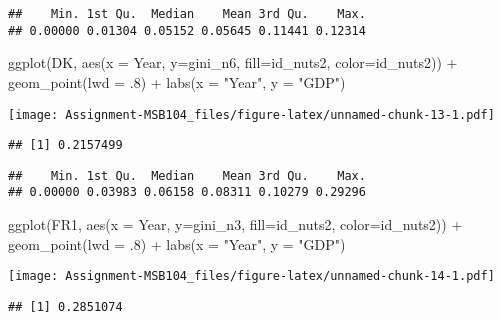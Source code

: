 \documentclass[
]{article}
\newenvironment{Shaded}{\begin{snugshade}}{\end{snugshade}}
\newcommand{\AttributeTok}[1]{\textcolor[rgb]{0.77,0.63,0.00}{#1}}
\newcommand{\DecValTok}[1]{\textcolor[rgb]{0.00,0.00,0.81}{#1}}
\newcommand{\FunctionTok}[1]{\textcolor[rgb]{0.00,0.00,0.00}{#1}}
\newcommand{\NormalTok}[1]{#1}
\newcommand{\SpecialCharTok}[1]{\textcolor[rgb]{0.00,0.00,0.00}{#1}}
\newcommand{\StringTok}[1]{\textcolor[rgb]{0.31,0.60,0.02}{#1}}
\begin{document}
\begin{verbatim}
##    Min. 1st Qu.  Median    Mean 3rd Qu.    Max. 
## 0.00000 0.01304 0.05152 0.05645 0.11441 0.12314
\end{verbatim}

\begin{Shaded}
\begin{Highlighting}[]
  \FunctionTok{ggplot}\NormalTok{(DK, }\FunctionTok{aes}\NormalTok{(}\AttributeTok{x =}\NormalTok{ Year, }\AttributeTok{y=}\NormalTok{gini\_n6, }\AttributeTok{fill=}\NormalTok{id\_nuts2, }\AttributeTok{color=}\NormalTok{id\_nuts2)) }\SpecialCharTok{+}
  \FunctionTok{geom\_point}\NormalTok{(}\AttributeTok{lwd =}\NormalTok{ .}\DecValTok{8}\NormalTok{) }\SpecialCharTok{+}
   \FunctionTok{labs}\NormalTok{(}\AttributeTok{x =} \StringTok{"Year"}\NormalTok{, }\AttributeTok{y =} \StringTok{"GDP"}\NormalTok{)}
\end{Highlighting}
\end{Shaded}

\texttt{[image: Assignment-MSB104\_files/figure-latex/unnamed-chunk-13-1.pdf]}

\begin{verbatim}
## [1] 0.2157499
\end{verbatim}

\begin{verbatim}
##    Min. 1st Qu.  Median    Mean 3rd Qu.    Max. 
## 0.00000 0.03983 0.06158 0.08311 0.10279 0.29296
\end{verbatim}

\begin{Shaded}
\begin{Highlighting}[]
  \FunctionTok{ggplot}\NormalTok{(FR1, }\FunctionTok{aes}\NormalTok{(}\AttributeTok{x =}\NormalTok{ Year, }\AttributeTok{y=}\NormalTok{gini\_n3, }\AttributeTok{fill=}\NormalTok{id\_nuts2, }\AttributeTok{color=}\NormalTok{id\_nuts2)) }\SpecialCharTok{+}
  \FunctionTok{geom\_point}\NormalTok{(}\AttributeTok{lwd =}\NormalTok{ .}\DecValTok{8}\NormalTok{) }\SpecialCharTok{+}
   \FunctionTok{labs}\NormalTok{(}\AttributeTok{x =} \StringTok{"Year"}\NormalTok{, }\AttributeTok{y =} \StringTok{"GDP"}\NormalTok{)}
\end{Highlighting}
\end{Shaded}

\texttt{[image: Assignment-MSB104\_files/figure-latex/unnamed-chunk-14-1.pdf]}

\begin{verbatim}
## [1] 0.2851074
\end{verbatim}
\end{document}
